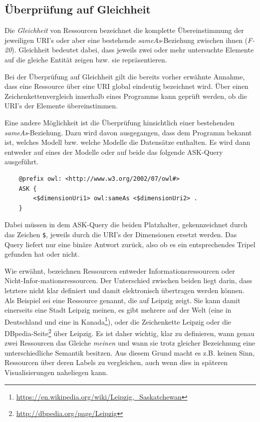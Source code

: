 \documentclass[11pt]{article}
\newcommand{\com}[1]{\marginpar{\em {\small{#1}}}} %
\begin{document}
%
%
\subsection{Überprüfung auf Gleichheit}
\label{sec:chapterSameAs}

Die \textit{Gleichheit} von Ressourcen bezeichnet die komplette Übereinstimmung\com{Anforderung \\ F-20, S. \pageref{req:F20}} der jeweiligen URI's oder aber eine bestehende \textit{sameAs}-Beziehung zwischen ihnen (\textit{F-20}).\label{req:F20source} Gleichheit bedeutet dabei, dass jeweils zwei oder mehr untersuchte Elemente auf die gleiche Entität zeigen bzw. sie repräsentieren.

\noindent
Bei der Überprüfung auf Gleichheit gilt die bereits vorher erwähnte Annahme, dass eine Ressource über eine URI global eindeutig bezeichnet wird. Über einen Zeichenkettenvergleich innerhalb eines Programms kann geprüft werden, ob die URI's der Elemente übereinstimmen.

Eine andere Möglichkeit ist die Überprüfung hinsichtlich einer bestehenden \textit{sameAs}-Beziehung. Dazu wird davon ausgegangen, dass dem Programm bekannt ist, welches Modell bzw. welche Modelle die Datensätze enthalten. Es wird dann entweder auf eines der Modelle oder auf beide das folgende ASK-Query ausgeführt.\\

\begin{verbatim}
    @prefix owl: <http://www.w3.org/2002/07/owl#>
    ASK {
        <$dimensionUri1> owl:sameAs <$dimensionUri2> .
    }
\end{verbatim}

\noindent
Dabei müssen in dem ASK-Query die beiden Platzhalter, gekennzeichnet durch das Zeichen \verb|$|, jeweils durch die URI's der Dimensionen ersetzt werden. Das Query liefert nur eine binäre Antwort zurück, also ob es ein entsprechendes Tripel gefunden hat oder nicht.

Wie erwähnt, bezeichnen Ressourcen\com{Mehrdeutigkeit} entweder Informationsressourcen oder Nicht-Infor-mationsressourcen. Der Unterschied zwischen beiden liegt darin, dass letztere nicht klar definiert und damit elektronisch übertragen werden können. Als Beispiel sei eine Ressource genannt, die auf Leipzig zeigt. Sie kann damit einerseits eine Stadt Leipzig meinen, es gibt mehrere auf der Welt (eine in Deutschland und eine in Kanada\footnote{\url{https://en.wikipedia.org/wiki/Leipzig,_Saskatchewan}}), oder die Zeichenkette Leipzig oder die DBpedia-Seite\footnote{\url{http://dbpedia.org/page/Leipzig}} über Leipzig. Es ist daher wichtig, klar zu definieren, wann genau zwei Ressourcen das Gleiche \emph{meinen} und wann sie trotz gleicher Bezeichnung eine unterschiedliche Semantik besitzen. Aus diesem Grund macht es z.B. keinen Sinn, Ressourcen über deren Labels zu vergleichen, auch wenn dies in späteren Visualisierungen naheliegen kann.
\end{document}
